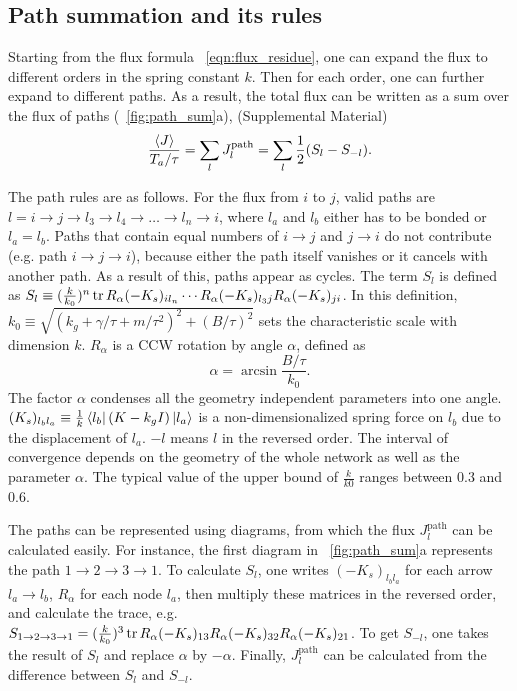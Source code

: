 \documentclass[
 preprint,
 preprintnumbers,
 amsmath,amssymb,
 aps,
 pre,
 longbibliography,
 superscriptaddress,
 10pt, twocolumn
]{revtex4-1}
\begin{document}
\subsection{Path summation and its rules}
Starting from the flux formula \eqnname~\eqref{eqn:flux_residue}, one can expand the flux to different orders in the spring constant $k$. Then for each order, one can further expand to different paths.
As a result, the total flux can be written as a sum over the flux of paths (\figurename~\ref{fig:path_sum}a), (Supplemental Material)
\begin{equation} \label{eqn:flux_path}
    \frac{\expval{J}}{T_a/\tau} = \sum_l J^\text{path}_l = \sum_l \frac{1}{2}(S_l - S_{-l}).
\end{equation}

The path rules are as follows.
For the flux from $i$ to $j$, valid paths are $l=i\rightarrow j\rightarrow l_3\rightarrow l_4\rightarrow \dots \rightarrow l_n\rightarrow i$, where $l_a$ and $l_b$ either has to be bonded or $l_a=l_b$. Paths that contain equal numbers of $i\rightarrow j$ and $j\rightarrow i$ do not contribute (e.g. path $i\rightarrow j\rightarrow i$), because either the path itself vanishes or it cancels with another path. As a result of this, paths appear as cycles.
The term $S_l$ is defined as $S_l \equiv (\frac{k}{k_0})^n \tr R_\alpha (-K_s)_{i l_n} \cdots R_\alpha (-K_s)_{l_3j} R_\alpha (-K_s)_{ji}$.
In this definition, $k_0\equiv \sqrt{(k_g+\gamma/\tau+m/\tau^2)^2 + (B/\tau)^2}$ sets the characteristic scale with dimension $k$. $R_\alpha$ is a CCW rotation by angle $\alpha$, defined as
\begin{equation} \label{eqn:path_alpha_def}
    \alpha = \arcsin{\frac{B/\tau}{k_0}}.
\end{equation}
The factor $\alpha$ condenses all the geometry independent parameters into one angle.
$(K_s)_{l_b l_a} \equiv \frac{1}{k}\bra{l_b}(K-k_gI)\ket{l_a}$ is a non-dimensionalized spring force on $l_b$ due to the displacement of $l_a$.
$-l$ means $l$ in the reversed order.
The interval of convergence depends on the geometry of the whole network as well as the parameter $\alpha$. The typical value of the upper bound of $\frac{k}{k0}$ ranges between $0.3$ and $0.6$.

The paths can be represented using diagrams, from which the flux $J^\text{path}_l$ can be calculated easily. For instance, the first diagram in \figurename~\ref{fig:path_sum}a represents the path $1\rightarrow 2\rightarrow 3\rightarrow 1$. To calculate $S_l$, one writes $(-K_s)_{l_bl_a}$ for each arrow $l_a\rightarrow l_b$, $R_\alpha$ for each node $l_a$, then multiply these matrices in the reversed order, and calculate the trace, e.g. $S_{1\rightarrow 2\rightarrow 3\rightarrow 1} = (\frac{k}{k_0})^3 \tr R_\alpha (-K_s)_{13} R_\alpha (-K_s)_{32} R_\alpha (-K_s)_{21}$. To get $S_{-l}$, one takes the result of $S_l$ and replace $\alpha$ by $-\alpha$. Finally, $J^\text{path}_l$ can be calculated from the difference between $S_l$ and $S_{-l}$.
\end{document}
